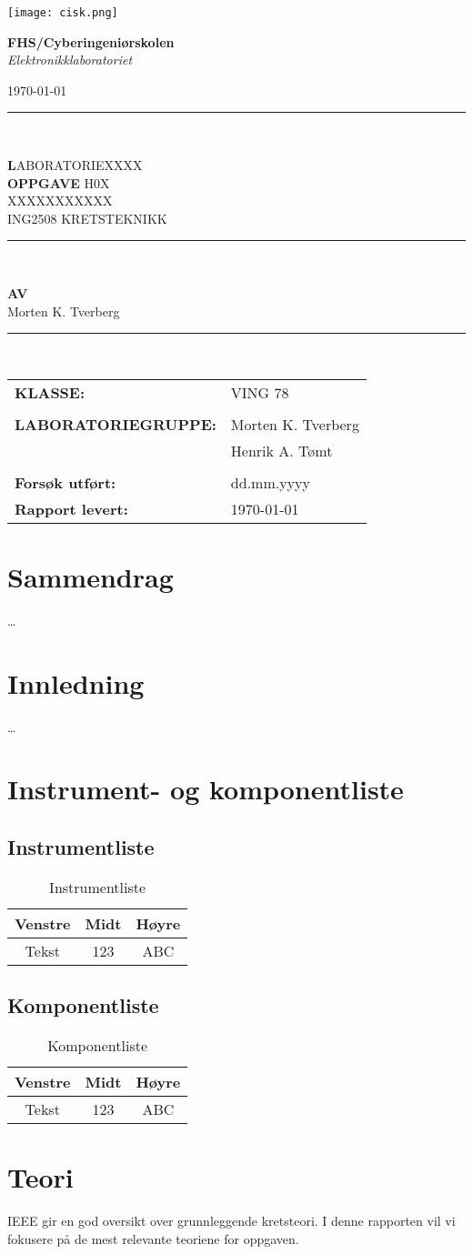 \documentclass[12pt,a4paper]{article}
\makeatletter
\newcommand{\institution}{FHS/Cyberingeniørskolen}
\newcommand{\laboratory}{Elektronikklaboratoriet}
\newcommand{\coursecode}{ING2508 \; KRETSTEKNIKK}
\newcommand{\assignmentno}{H0X}
\newcommand{\assignmenttype}{LABORATORIEXXXX}
\newcommand{\assignmenttitle}{XXXXXXXXXXX}
\newcommand{\studentname}{Morten K. Tverberg}
\newcommand{\partnername}{Henrik A. Tømt}
\newcommand{\class}{VING 78}
\newcommand{\labdate}{dd.mm.yyyy}
\newcommand{\submissiondate}{\today}
\newcommand{\makelabtitle}{%
    \thispagestyle{empty}
    \begin{minipage}{0.15\textwidth}
        \texttt{[image: cisk.png]}
    \end{minipage}%
    \begin{minipage}{0.4\textwidth}
        \vspace{10ex}
        \raggedright
        {\bfseries \institution}\\
        {\itshape \laboratory}
    \end{minipage}%
    \begin{minipage}{0.4\textwidth}
        \vspace{13ex}
        \raggedleft
        \today 
    \end{minipage}
    \vspace{1ex}

{\noindent\rule{\textwidth}{2pt}} \\ \vspace{3ex}
\begin{center}
    {\Huge \textbf \assignmenttype}\\[2ex]
    {\Large \textbf {OPPGAVE} \assignmentno}\\[6ex]
    {\LARGE \assignmenttitle}\\[10ex]
    {\large \coursecode}\\[3ex]

{\noindent\rule{\textwidth}{2pt}} \\\vspace{5ex}

    \textbf{AV}\\[1ex]
    {\large \studentname}\\ [5ex]
\end{center}

{\noindent\rule{\textwidth}{2pt}} \\\vspace{5ex}

\begin{flushleft}
    \begin{tabular}{@{}ll}
    \textbf{KLASSE:} & \class \\
    \vspace{2ex} \\
    \textbf{LABORATORIEGRUPPE:} & \studentname \\
    \textbf{} & \partnername \\
    \vspace{2ex} \\
    \textbf{Forsøk utført:} & \labdate \\
    \textbf{Rapport levert:} & \submissiondate \\
    \end{tabular}
\end{flushleft}
\clearpage
}
\makeatother
\begin{document}
\makelabtitle

\setcounter{page}{1}

\section*{Sammendrag}
\dots

\clearpage

\tableofcontents
\clearpage

\setcounter{page}{1}

\section{Innledning}
\dots

\section{Instrument- og komponentliste}
\subsection{Instrumentliste}
\begin{table}[h]
    \centering
    \caption{Instrumentliste}
    \label{tab:Tabell1}
    \begin{tabular}{|c|c|c|}
        \hline
        Venstre & Midt & Høyre \\ \hline
        Tekst   & 123  & ABC   \\ \hline
    \end{tabular}
\end{table}

\subsection{Komponentliste}
\begin{table}[h]
    \centering
    \caption{Komponentliste}
    \label{tab:Tabell2}
    \begin{tabular}{|c|c|c|}
        \hline
        Venstre & Midt & Høyre \\ \hline
        Tekst   & 123  & ABC   \\ \hline
    \end{tabular}
\end{table}

\section{Teori}
IEEE \parencite{ieeeGuide} gir en god oversikt over grunnleggende kretsteori. 
I denne rapporten vil vi fokusere på de mest relevante teoriene for oppgaven.
\end{document}
